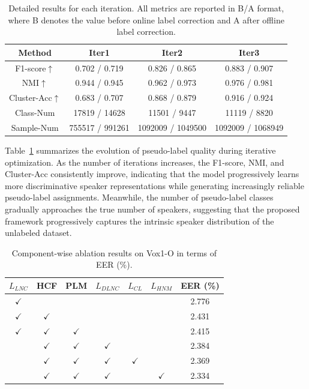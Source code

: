 \documentclass[lettersize,journal]{IEEEtran}
\begin{document}
\begin{table}[htbp] %
    \centering
    \caption{ Detailed results for each iteration. All metrics are reported in B/A format, where B denotes the value before online label correction and A after offline label correction.} %
    \setlength{\tabcolsep}{3.6pt} %
    \begin{tabular}{c c c c} %
        \hline
        Method & Iter1 & Iter2 & Iter3   \\
        \hline
        F1-score$\uparrow$  & 0.702 / 0.719 & 0.826 / 0.865 & 0.883 / 0.907 \\  
        NMI$\uparrow$  & 0.944 / 0.945 & 0.962 / 0.973 & 0.976 / 0.981 \\
        Cluster-Acc$\uparrow$  & 0.683 / 0.707 & 0.868 / 0.879 & 0.916 / 0.924 \\
        Class-Num  & 17819 / 14628 & 11501 / 9447 & 11119 / 8820 \\
        Sample-Num  & 755517 / 991261 & 1092009 / 1049500 & 1092009 / 1068949 \\
        \hline
    \end{tabular}
    \label{tab:iteration}
\end{table}
\FloatBarrier
Table~\ref{tab:iteration} summarizes the evolution of pseudo-label quality during iterative optimization. As the number of iterations increases, the F1-score, NMI, and Cluster-Acc consistently improve, indicating that the model progressively learns more discriminative speaker representations while generating increasingly reliable pseudo-label assignments. Meanwhile, the number of pseudo-label classes gradually approaches the true number of speakers, suggesting that the proposed framework progressively captures the intrinsic speaker distribution of the unlabeled dataset.
\begin{table}[htbp] %
    \centering
    \caption{Component-wise ablation results on Vox1-O in terms of EER (\%).} %
    \setlength{\tabcolsep}{6.5pt} %
    \begin{tabular}{c c c c c c c} %
        \hline
        $L_{LNC}$ & HCF & PLM & $L_{DLNC}$  & $L_{CL}$ & $L_{HNM}$ & EER (\%)\\
        \hline
        $\checkmark$ & & & & & & 2.776  \\  
        $\checkmark$ & $\checkmark$ & & & & & 2.431\\
        $\checkmark$ & $\checkmark$  & $\checkmark$ & & & & 2.415\\
        &$\checkmark$ & $\checkmark$  & $\checkmark$ & & & 2.384\\
        &$\checkmark$ & $\checkmark$  & $\checkmark$ &$\checkmark$ & & 2.369\\
        &$\checkmark$ & $\checkmark$  & $\checkmark$ & &$\checkmark$ & 2.334\\
        \hline
    \end{tabular}
    \label{tab:ablation}
\end{table}
\FloatBarrier
\end{document}
